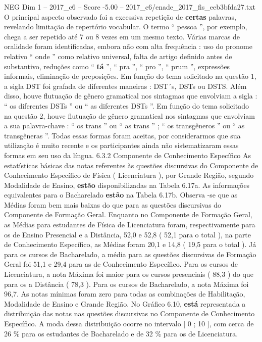 \begin{textsample}{NEG Dim 1 – 2017\_c6 – Score -5.00 – 2017\_c6/enade\_2017\_fis\_eeb3bfda27.txt}
O principal aspecto observado foi a excessiva repetição de \textbf{certas} palavras, revelando limitação de repertório vocabular.
O termo “ pessoa ”, por exemplo, chega a ser repetido até 7 ou 8 vezes em um mesmo texto.
Várias marcas de oralidade foram identificadas, embora não com alta frequência : uso do pronome relativo “ onde ” como relativo universal, falta de artigo definido antes de substantivo, reduções como “ \textbf{tá} ”, “ pra ”, “ pro ”, “ prum ”, expressões informais, eliminação de preposições.
Em função do tema solicitado na questão 1, a sigla DST foi grafada de diferentes maneiras : DST´s, DSTs ou DSTS.
Além disso, houve flutuação de gênero gramatical nos sintagmas que envolviam a sigla : “ os diferentes DSTs ” ou “ as diferentes DSTs ”.
Em função do tema solicitado na questão 2, houve flutuação de gênero gramatical nos sintagmas que envolviam a sua palavra-chave : “ os trans ” ou “ as trans ” ; “ os transgêneros ” ou “ as transgêneras ”.
Todas essas formas foram aceitas, por considerarmos que sua utilização é muito recente e os participantes ainda não sistematizaram essas formas em seu uso da língua. 6.3.2 Componente de Conhecimento Específico As estatísticas básicas das notas referentes às questões discursivas do Componente de Conhecimento Específico de Física ( Licenciatura ), por Grande Região, segundo Modalidade de Ensino, \textbf{estão} disponibilizadas na Tabela 6.17a.
As informações equivalentes para o Bacharelado \textbf{estão} na Tabela 6.17b.
Observa -se que as Médias foram bem mais baixas do que para as questões discursivas do Componente de Formação Geral.
Enquanto no Componente de Formação Geral, as Médias para estudantes de Física de Licenciatura foram, respectivamente para os de Ensino Presencial e a Distância, 52,0 e 52,8 ( 52,1 para o total ), na parte de Conhecimento Específico, as Médias foram 20,1 e 14,8 ( 19,5 para o total ).
Já para os cursos de Bacharelado, a média para as questões discursivas de Formação Geral foi 51,1 e 29,4 para as de Conhecimento Específico.
Para os cursos de Licenciatura, a nota Máxima foi maior para os cursos presenciais ( 88,3 ) do que para os a Distância ( 78,3 ).
Para os cursos de Bacharelado, a nota Máxima foi 96,7.
As notas mínimas foram zero para todas as combinações de Habilitação, Modalidade de Ensino e Grande Região.
No Gráfico 6.10, \textbf{está} representada a distribuição das notas nas questões discursivas no Componente de Conhecimento Específico.
A moda dessa distribuição ocorre no intervalo [ 0 ; 10 ], com cerca de 26 \% para os estudantes de Bacharelado e de 32 \% para os de Licenciatura.

\end{textsample}
